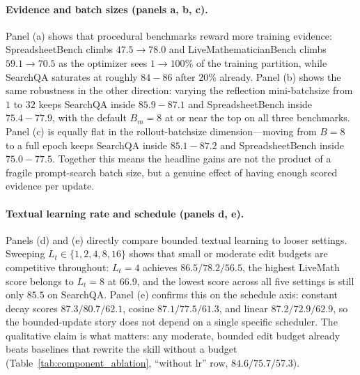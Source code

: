 \paragraph{Evidence and batch sizes (panels a, b, c).}
Panel (a) shows that procedural benchmarks reward more training evidence: SpreadsheetBench climbs $47.5{\to}78.0$ and LiveMathematicianBench climbs $59.1{\to}70.5$ as the optimizer sees $1{\to}100\%$ of the training partition, while SearchQA saturates at roughly $84{-}86$ after $20\%$ already. Panel (b) shows the same robustness in the other direction: varying the reflection mini-batchsize from $1$ to $32$ keeps SearchQA inside $85.9{-}87.1$ and SpreadsheetBench inside $75.4{-}77.9$, with the default $B_m{=}8$ at or near the top on all three benchmarks. Panel (c) is equally flat in the rollout-batchsize dimension---moving from $B{=}8$ to a full epoch keeps SearchQA inside $85.1{-}87.2$ and SpreadsheetBench inside $75.0{-}77.5$. Together this means the headline gains are not the product of a fragile prompt-search batch size, but a genuine effect of having enough scored evidence per update.

\paragraph{Textual learning rate and schedule (panels d, e).}
Panels (d) and (e) directly compare bounded textual learning to looser settings. Sweeping $L_t \in \{1,2,4,8,16\}$ shows that small or moderate edit budgets are competitive throughout: $L_t{=}4$ achieves $86.5/78.2/56.5$, the highest LiveMath score belongs to $L_t{=}8$ at $66.9$, and the lowest score across all five settings is still only $85.5$ on SearchQA. Panel (e) confirms this on the schedule axis: constant decay scores $87.3/80.7/62.1$, cosine $87.1/77.5/61.3$, and linear $87.2/72.9/62.9$, so the bounded-update story does not depend on a single specific scheduler. The qualitative claim is what matters: any moderate, bounded edit budget already beats baselines that rewrite the skill without a budget (Table~\ref{tab:component_ablation}, ``without lr'' row, $84.6/75.7/57.3$).

